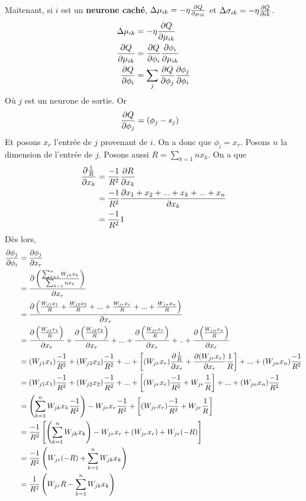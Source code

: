 Maitenant, si $i$ est un \textbf{neurone caché}, $\Delta\mu_{ik} = -\eta\frac{\partial Q}{\partial \mu_{ik}}$ et $\Delta\sigma_{ik} = -\eta\frac{\partial Q}{\partial ik}$.
\begin{equation}
 \begin{split}
 \Delta \mu_{ik} & = -\eta \frac{\partial Q}{\partial \mu_{ik}}\\
 \frac{\partial Q}{\partial \mu_{ik}} & = \frac{\partial Q}{\partial \phi_i} \frac{\partial \phi_i}{\partial \mu_{ik}}\\
 \frac{\partial Q}{\partial \phi_i} & = \sum_{j} \frac{\partial Q}{\partial \phi_j}\frac{\partial \phi_j}{\partial \phi_i}
 \end{split}
\end{equation}
Où $j$ est un neurone de sortie. Or
\begin{equation}
 \begin{split}
 \frac{\partial Q}{\partial \phi_j} & = (\phi_j - s_j)
 \end{split}
\end{equation}
Et posons $x_r$ l'entrée de $j$ provenant de $i$. On a donc que $\phi_i = x_r$.
Posons $n$ la dimension de l'entrée de $j$.
Posons aussi $R = \sum_{k=1}{n}x_k$.
On a que
\begin{equation}
 \begin{split}
 \frac{\partial \frac{1}{R}}{\partial x_k} & = \frac{-1}{R^2}\frac{\partial R}{\partial x_k}\\
 ~ & = \frac{-1}{R^2}\frac{\partial x_1+x_2+...+x_k+...+x_n}{\partial x_k}\\
 ~ & = \frac{-1}{R^2} 1
 \end{split}
\end{equation}
Dès lors,
\begin{equation}
 \begin{split}
 \frac{\partial \phi_j}{\partial \phi_i} & = \frac{\partial \phi_j}{\partial x_r}\\
 ~ & = \frac{\partial \left(\frac{\sum_{k=1}^{n}W_{jk}x_k}{\sum_{k=1}{n}x_k}\right)}{\partial x_r}\\
 ~ & = \frac{\partial \left(\frac{W_{j1}x_1}{R} + \frac{W_{j2}x_2}{R} + ... + \frac{W_{jr}x_r}{R} + ... + \frac{W_{jn}x_n}{R}\right)}{\partial x_r}\\
 ~ & = \frac{\partial \left(\frac{W_{j1}x_1}{R}\right)}{\partial x_r} + \frac{\partial \left(\frac{W_{j2}x_2}{R}\right)}{\partial x_r} + ... + \frac{\partial \left(\frac{W_{jr}x_r}{R}\right)}{\partial x_r} + .. + \frac{\partial \left(\frac{W_{jn}x_n}{R}\right)}{\partial x_r}\\
 ~ & = (W_{j1}x_1)\frac{-1}{R^2} + (W_{j2}x_2)\frac{-1}{R^2} + ... + \left[(W_{jr}x_r)\frac{\partial \frac{1}{R}}{\partial x_r}+\frac{\partial (W_{jr}x_r)}{\partial x_r}\frac{1}{R}\right] + ... + (W_{jn}x_n)\frac{-1}{R^2}\\
 ~ & = (W_{j1}x_1)\frac{-1}{R^2} + (W_{j2}x_2)\frac{-1}{R^2} + ... + \left[(W_{jr}x_r)\frac{-1}{R^2}+W_{jr}\frac{1}{R}\right] + ... + (W_{jn}x_n)\frac{-1}{R^2}\\
 ~ & = \left(\sum_{k=1}^{n}W_{jk}x_k\frac{-1}{R^2}\right)-W_{jr}x_r\frac{-1}{R^2} + \left[(W_{jr}x_r)\frac{-1}{R^2}+W_{jr}\frac{1}{R}\right]\\
 ~ & = \frac{-1}{R^2} \left[\left(\sum_{k=1}^{n}W_{jk}x_k\right)-W_{jr}x_r + (W_{jr}x_r) + W_{jr}(-R)\right]\\
 ~ & = \frac{-1}{R^2} \left(W_{jr}(-R) + \sum_{k=1}^{n}W_{jk}x_k\right)\\
 ~ & = \frac{1}{R^2} \left(W_{jr}R - \sum_{k=1}^{n}W_{jk}x_k\right)
 \end{split}
\end{equation}
